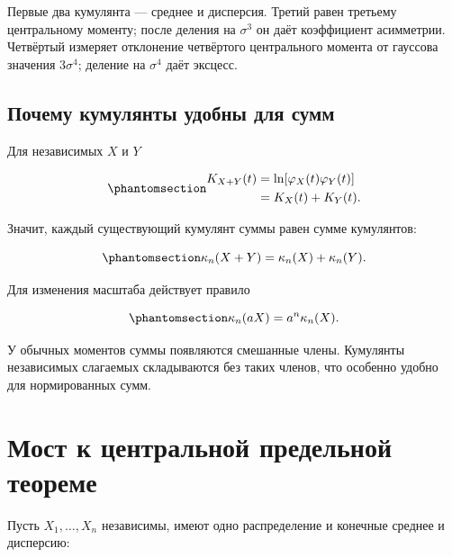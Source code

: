 \documentclass[
  russian,
  11pt,
  a4paper,
  open=any]{scrbook}
\begin{document}
Первые два кумулянта --- среднее и дисперсия. Третий равен третьему
центральному моменту; после деления на \(\sigma^3\) он даёт коэффициент
асимметрии. Четвёртый измеряет отклонение четвёртого центрального
момента от гауссова значения \(3\sigma^4\); деление на \(\sigma^4\) даёт
эксцесс.

\subsection{Почему кумулянты удобны для
сумм}\label{ux43fux43eux447ux435ux43cux443-ux43aux443ux43cux443ux43bux44fux43dux442ux44b-ux443ux434ux43eux431ux43dux44b-ux434ux43bux44f-ux441ux443ux43cux43c}

Для независимых \(X\) и \(Y\)

\begin{equation}\protect\phantomsection\label{eq-cumulant-log-additivity}{
\begin{aligned}
K_{X+Y}(t)
&=\ln\!\left[\varphi_X(t)\varphi_Y(t)\right]\\
&=K_X(t)+K_Y(t).
\end{aligned}
}\end{equation}

Значит, каждый существующий кумулянт суммы равен сумме кумулянтов:

\begin{equation}\protect\phantomsection\label{eq-cumulant-additivity}{
\kappa_n(X+Y)=\kappa_n(X)+\kappa_n(Y).
}\end{equation}

Для изменения масштаба действует правило

\begin{equation}\protect\phantomsection\label{eq-cumulant-scaling}{
\kappa_n(aX)=a^n\kappa_n(X).
}\end{equation}

У обычных моментов суммы появляются смешанные члены. Кумулянты
независимых слагаемых складываются без таких членов, что особенно удобно
для нормированных сумм.

\section{Мост к центральной предельной
теореме}\label{ux43cux43eux441ux442-ux43a-ux446ux435ux43dux442ux440ux430ux43bux44cux43dux43eux439-ux43fux440ux435ux434ux435ux43bux44cux43dux43eux439-ux442ux435ux43eux440ux435ux43cux435}

Пусть \(X_1,\ldots,X_n\) независимы, имеют одно распределение и конечные
среднее и дисперсию:
\end{document}
